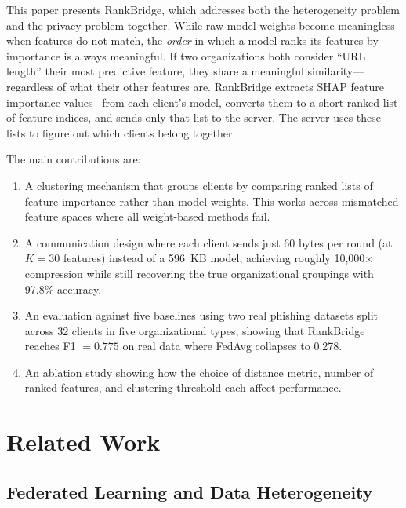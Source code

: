 \documentclass[information,article,submit,pdftex]{mdpi}
\begin{document}
This paper presents RankBridge, which addresses both the heterogeneity problem
and the privacy problem together. While raw model weights become meaningless when
features do not match, the \textit{order} in which a model ranks its features by
importance is always meaningful. If two organizations both consider ``URL length''
their most predictive feature, they share a meaningful similarity---regardless of
what their other features are. RankBridge extracts SHAP feature importance
values~\cite{lundberg2017shap} from each client's model, converts them to a short
ranked list of feature indices, and sends only that list to the server. The server
uses these lists to figure out which clients belong together.

The main contributions are:

\begin{enumerate}[leftmargin=*]
  \item A clustering mechanism that groups clients by comparing ranked lists of
    feature importance rather than model weights. This works across mismatched
    feature spaces where all weight-based methods fail.
  \item A communication design where each client sends just 60 bytes per round
    (at $K=30$ features) instead of a 596~KB model, achieving roughly
    10{,}000$\times$ compression while still recovering the true organizational
    groupings with 97.8\% accuracy.
  \item An evaluation against five baselines using two real phishing datasets
    split across 32 clients in five organizational types, showing that RankBridge
    reaches F1 $= 0.775$ on real data where FedAvg collapses to 0.278.
  \item An ablation study showing how the choice of distance metric, number of
    ranked features, and clustering threshold each affect performance.
\end{enumerate}

\section{Related Work}\label{sec:related}

\subsection{Federated Learning and Data Heterogeneity}
\end{document}
